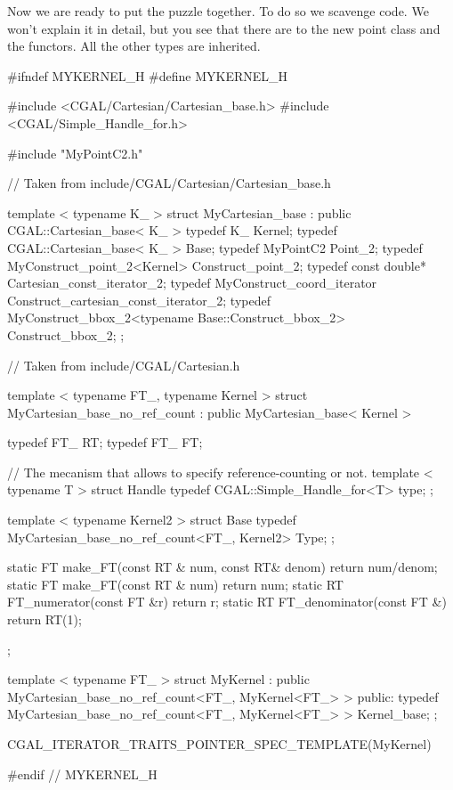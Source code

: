 Now we are ready to put the puzzle together. To do so we
scavenge code. We won't explain it in detail, but you see
that there are  to the new point class and
the functors. All the other types are inherited.

\ccHtmlLinksOff
\begin{ccExampleCode}
#ifndef MYKERNEL_H
#define MYKERNEL_H

#include <CGAL/Cartesian/Cartesian_base.h>
#include <CGAL/Simple_Handle_for.h>


#include "MyPointC2.h"

// Taken from include/CGAL/Cartesian/Cartesian_base.h

template < typename K_ >
struct MyCartesian_base : public CGAL::Cartesian_base< K_ >
{
  typedef K_                                Kernel;
  typedef CGAL::Cartesian_base< K_ >        Base;
  typedef MyPointC2                         Point_2;
  typedef MyConstruct_point_2<Kernel>       Construct_point_2;
  typedef const double*                     Cartesian_const_iterator_2;
  typedef MyConstruct_coord_iterator        Construct_cartesian_const_iterator_2;
  typedef MyConstruct_bbox_2<typename Base::Construct_bbox_2> 
                                            Construct_bbox_2;
};


// Taken from include/CGAL/Cartesian.h

template < typename FT_, typename Kernel >
struct MyCartesian_base_no_ref_count
  : public MyCartesian_base< Kernel >
{
    typedef FT_                                           RT;
    typedef FT_                                           FT;

    // The mecanism that allows to specify reference-counting or not.
    template < typename T >
    struct Handle { typedef CGAL::Simple_Handle_for<T>   type; };

    template < typename Kernel2 >
    struct Base { typedef MyCartesian_base_no_ref_count<FT_, Kernel2>  Type; };

    static   FT make_FT(const RT & num, const RT& denom) { return num/denom;}
    static   FT make_FT(const RT & num)                  { return num;}
    static   RT FT_numerator(const FT &r)                { return r;}
    static   RT FT_denominator(const FT &)               { return RT(1);}
};

template < typename FT_ >
struct MyKernel
  : public MyCartesian_base_no_ref_count<FT_, MyKernel<FT_> >
{
public:
  typedef MyCartesian_base_no_ref_count<FT_, MyKernel<FT_> > Kernel_base;
};

CGAL_ITERATOR_TRAITS_POINTER_SPEC_TEMPLATE(MyKernel)

#endif // MYKERNEL_H

\end{ccExampleCode}
\ccHtmlLinksOn


